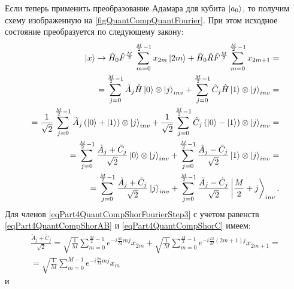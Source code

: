 

Если теперь применить преобразование Адамара для кубита
$\ket{a_0}$, то получим схему изображенную на
\autoref{figQuantCompQuantFourier}. При этом исходное состояние
преобразуется по следующему закону:
\begin{eqnarray}
\ket{x} \rightarrow
\hat{H}_0\hat{F}^{\frac{M}{2}} \sum_{m = 0}^{\frac{M}{2} - 1}x_{2m} \ket{2m} +
\hat{H}_0\hat{R}\hat{F}^{\frac{M}{2}}\sum_{m = 0}^{\frac{M}{2} - 1} x_{2m + 1} =
\nonumber \\
=
\sum_{j = 0}^{\frac{M}{2} - 1}
\tilde{A}_{j}
\hat{H}\ket{0} \otimes \ket{j}_{inv}
+
\sum_{j = 0}^{\frac{M}{2} - 1} 
\tilde{C}_{j}
\hat{H}\ket{1} \otimes \ket{j}_{inv} 
=
\nonumber \\
= 
\frac{1}{\sqrt{2}}\sum_{j = 0}^{\frac{M}{2} - 1}
\tilde{A}_{j} 
\left(\ket{0} + \ket{1} \right) \otimes  
\ket{j}_{inv}
+
\frac{1}{\sqrt{2}}\sum_{j = 0}^{\frac{M}{2} - 1}
\tilde{C}_{j} 
\left(\ket{0} - \ket{1} \right) \otimes  
\ket{j}_{inv}
=
\nonumber \\
=
\sum_{j = 0}^{\frac{M}{2} - 1}
\frac{\tilde{A}_{j} + \tilde{C}_{j} }{\sqrt{2}} 
\ket{0} \otimes \ket{j}_{inv} +
\sum_{j = 0}^{\frac{M}{2} - 1}
\frac{ \tilde{A}_{j} - \tilde{C}_{j}}{\sqrt{2}} 
\ket{1} \otimes \ket{j}_{inv}
=
\nonumber \\
=
\sum_{j = 0}^{\frac{M}{2} - 1}
\frac{\tilde{A}_{j} + \tilde{C}_{j} }{\sqrt{2}} \ket{j}_{inv} +
\sum_{j = 0}^{\frac{M}{2} - 1}
\frac{ \tilde{A}_{j} - \tilde{C}_{j}}{\sqrt{2}} 
\left|\frac{M}{2} + j \right>_{inv}.
\label{eqPart4QuantCompShorFourierStep3}
\end{eqnarray}
Для членов \eqref{eqPart4QuantCompShorFourierStep3} с учетом равенств
\eqref{eqPart4QuantCompShorAB} и \eqref{eqPart4QuantCompShorC} имеем:
\begin{eqnarray}
\frac{\tilde{A}_{j} + \tilde{C}_{j} }{\sqrt{2}} = 
\sqrt{\frac{1}{M}} 
\sum_{m = 0}^{\frac{M}{2} - 1} e^{-i \frac{4 \pi}{M} m j} x_{2m}  +
\sqrt{\frac{1}{M}} 
\sum_{m = 0}^{\frac{M}{2} - 1} 
e^{-i \frac{2 \pi}{M} \left(2m+1\right) j} x_{2m+1} = 
\nonumber \\
=
\sqrt{\frac{1}{M}} \sum_{m = 0}^{M - 1}
e^{-i \frac{2 \pi}{M} m j} x_{m}
\label{eqPart4QuantCompShorFourierStep3_1}
\end{eqnarray}
и
